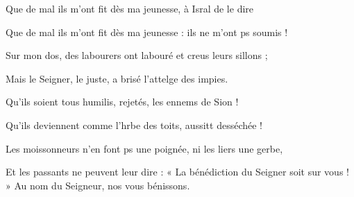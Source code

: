 \item Que de mal ils m’ont fit dès ma jeunesse,\psstar{} à Isral de le dire
\item Que de mal ils m’ont fit dès ma jeunesse :\psstar{} ils ne m’ont ps soumis !
\item Sur mon dos, des labourers ont labouré\psstar{} et creus leurs sillons ;
\item Mais le Seigner, le juste,\psstar{} a brisé l’attelge des impies.
\item Qu’ils soient tous humilis, rejetés,\psstar{} les ennems de Sion !\psstar{}
\item Qu’ils deviennent comme l’hrbe des toits,\psstar{} aussitt desséchée !
\item Les moissonneurs n’en font ps une poignée,\psstar{} ni les liers une gerbe,
\item Et les passants ne peuvent leur dire :\pscross{} « La bénédiction du Seigner soit sur vous ! »\psstar{} Au nom du Seigneur, nos vous bénissons.